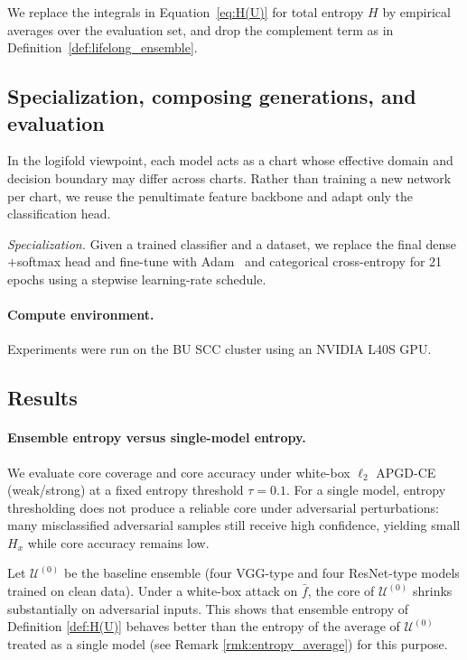 \documentclass{article}
\theoremstyle{plain}
\theoremstyle{definition}
\theoremstyle{remark}
\newcommand{\cU}{\mathcal{U}}
\begin{document}
We replace the integrals in Equation~\eqref{eq:H(U)} for total entropy $H$ by empirical averages over the evaluation set, and drop the complement term as in Definition~\ref{def:lifelong_ensemble}.

\subsection{Specialization, composing generations, and evaluation}
\label{subsec:specialization_and_evaluation}

In the logifold viewpoint, each model acts as a chart whose effective domain and decision boundary may differ across charts.
Rather than training a new network per chart, we reuse the penultimate feature backbone and adapt only the classification head.

\emph{Specialization.} Given a trained classifier and a dataset, we replace the final dense$+$softmax head and fine-tune with Adam~\cite{Adam} and categorical cross-entropy for 21 epochs using a stepwise learning-rate schedule.

\paragraph{Compute environment.}
Experiments were run on the BU SCC cluster using an NVIDIA L40S GPU.


\subsection{Results}
\label{subsec:results}

\paragraph{Ensemble entropy versus single-model entropy.}
We evaluate core coverage and core accuracy under white-box $\ell_2$ APGD-CE (weak/strong) at a fixed entropy threshold $\tau=0.1$.
For a single model, entropy thresholding does not produce a reliable core under adversarial perturbations: many misclassified adversarial samples still receive high confidence, yielding small $H_x$ while core accuracy remains low.


Let $\cU^{(0)}$ be the baseline ensemble (four VGG-type and four ResNet-type models trained on clean data).
Under a white-box attack on $\bar f$, the core of $\cU^{(0)}$ shrinks substantially on adversarial inputs.
This shows that ensemble entropy of Definition \ref{def:H(U)} behaves better than the entropy of the average of \(\cU^{(0)}\) treated as a single model (see Remark \ref{rmk:entropy_average}) for this purpose.
\end{document}
